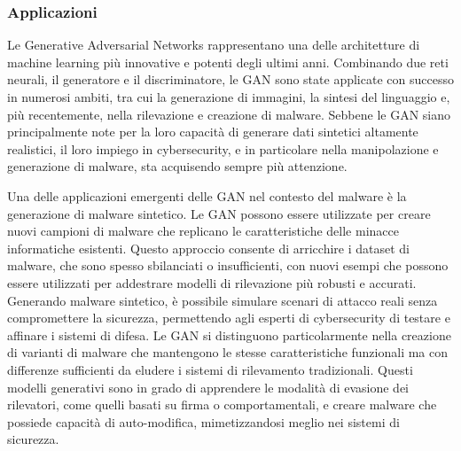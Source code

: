 


\subsubsection{Applicazioni}
Le Generative Adversarial Networks rappresentano una delle architetture di machine learning più innovative e potenti degli ultimi anni. Combinando due reti neurali, il generatore e il discriminatore, le GAN sono state applicate con successo in numerosi ambiti, tra cui la generazione di immagini, la sintesi del linguaggio e, più recentemente, nella rilevazione e creazione di malware. Sebbene le GAN siano principalmente note per la loro capacità di generare dati sintetici altamente realistici, il loro impiego in cybersecurity, e in particolare nella manipolazione e generazione di malware, sta acquisendo sempre più attenzione.

Una delle applicazioni emergenti delle GAN nel contesto del malware è la generazione di malware sintetico. Le GAN possono essere utilizzate per creare nuovi campioni di malware che replicano le caratteristiche delle minacce informatiche esistenti. Questo approccio consente di arricchire i dataset di malware, che sono spesso sbilanciati o insufficienti, con nuovi esempi che possono essere utilizzati per addestrare modelli di rilevazione più robusti e accurati. Generando malware sintetico, è possibile simulare scenari di attacco reali senza compromettere la sicurezza, permettendo agli esperti di cybersecurity di testare e affinare i sistemi di difesa.
Le GAN si distinguono particolarmente nella creazione di varianti di malware che mantengono le stesse caratteristiche funzionali ma con differenze sufficienti da eludere i sistemi di rilevamento tradizionali. Questi modelli generativi sono in grado di apprendere le modalità di evasione dei rilevatori, come quelli basati su firma o comportamentali, e creare malware che possiede capacità di auto-modifica, mimetizzandosi meglio nei sistemi di sicurezza.

